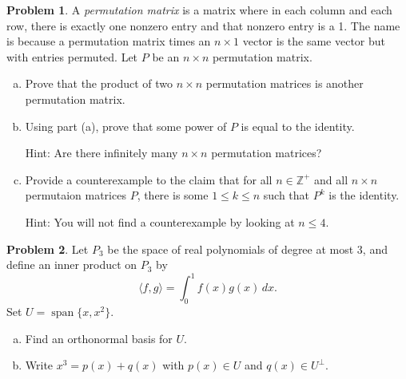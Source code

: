 \documentclass[11pt,oneside]{amsart}
\theoremstyle{definition}
\newtheorem{problem}{Problem}
\newcommand{\bZ}{\mathbb{Z}}
\DeclareMathOperator{\Span}{span}
\begin{document}
    \begin{problem}
        A \emph{permutation matrix} is a matrix where in each column and each row, there is exactly one nonzero entry and that nonzero entry is a 1. The name is because a permutation matrix times an $n\times 1$ vector is the same vector but with entries permuted. Let $P$ be an $n\times n$ permutation matrix.
        \begin{enumerate}[(a)]
            \item Prove that the product of two $n\times n$ permutation matrices is another permutation matrix.
            \item Using part (a), prove that some power of $P$ is equal to the identity.
            
            Hint: Are there infinitely many $n\times n$ permutation matrices?
            \item Provide a counterexample to the claim that for all $n\in\bZ^+$ and all $n\times n$ permutaion matrices $P$, there is some $1\leq k\leq n$ such that $P^k$ is the identity.
            
            Hint: You will not find a counterexample by looking at $n\leq 4$.
        \end{enumerate}
    \end{problem}

    \begin{problem}
        Let $P_3$ be the space of real polynomials of degree at most 3, and define an inner product on $P_3$ by
        \[\langle f,g\rangle=\int_0^1 f(x)g(x)\,dx.\]
        Set $U=\Span\{x,x^2\}$.
        \begin{enumerate}[(a)]
            \item Find an orthonormal basis for $U$.
            \item Write $x^3=p(x)+q(x)$ with $p(x)\in U$ and $q(x)\in U^\perp$.
        \end{enumerate}
    \end{problem}
\end{document}

